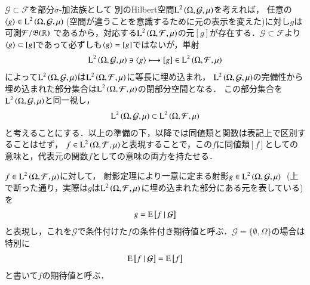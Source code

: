 	$\mathcal{G} \subset \mathcal{F}$を部分$\sigma$-加法族として
	別のHilbert空間$\operatorname{L}^{2} \left(\Omega, \mathcal{G},\mu\right)$を考えれば，
	任意の$\inprod<g> \in \Lp{2}{\Omega, \mathcal{G},\mu}\ $(空間が違うことを意識するために元の表示を変えた)に対し$g$は可測$\mathcal{F}/\mathfrak{B}(\mathbb{R})$
	であるから，対応する$\operatorname{L}^{2} \left(\Omega, \mathcal{F},\mu\right)$の元$[g]$が存在する．$\mathcal{G} \subset \mathcal{F}$より
	$\inprod<g> \subset [g]$であって必ずしも$\inprod<g> = [g]$ではないが，単射
	\begin{align}
		\Lp{2}{\Omega, \mathcal{G},\mu} \ni \inprod<g> \longmapsto [g] \in \Lp{2}{\Omega, \mathcal{F},\mu}
	\end{align}
	によって$\operatorname{L}^{2} \left(\Omega, \mathcal{G},\mu\right)$は$\operatorname{L}^{2} \left(\Omega, \mathcal{F},\mu\right)$に等長に埋め込まれ，
	$\operatorname{L}^{2} \left(\Omega, \mathcal{G},\mu\right)$の完備性から埋め込まれた部分集合は$\operatorname{L}^{2} \left(\Omega, \mathcal{F},\mu\right)$の閉部分空間となる．
	この部分集合を$\operatorname{L}^{2} \left(\Omega, \mathcal{G},\mu\right)$と同一視し，
	\begin{align}
		\operatorname{L}^{2} \left(\Omega, \mathcal{G},\mu\right) \subset \operatorname{L}^{2} \left(\Omega, \mathcal{F},\mu\right)
	\end{align}
	と考えることにする．以上の準備の下，以降では同値類と関数は表記上で区別することはせず，
	$f \in \operatorname{L}^{2} \left(\Omega, \mathcal{F},\mu\right)$と表現することで，この$f$に同値類$[f]$としての意味と，代表元の関数$f$としての意味の両方を持たせる．
	
	\begin{dfn}[条件付き期待値]
		$f \in \operatorname{L}^{2} \left(\Omega, \mathcal{F},\mu\right)$に対して，
		射影定理により一意に定まる射影$g \in \operatorname{L}^{2} \left(\Omega, \mathcal{G},\mu\right)\ $
		(上で断った通り，実際は$g$は$\operatorname{L}^{2} \left(\Omega, \mathcal{F},\mu\right)$に埋め込まれた部分にある元を表している)を
		\begin{align}
			g = \operatorname{E} \left[ f \ \middle|\ \mathcal{G} \right]
		\end{align}
		と表現し，これを$\mathcal{G}$で条件付けた$f$の条件付き期待値と呼ぶ．$\mathcal{G} = \{\emptyset, \Omega\}$の場合は特別に
		\begin{align}
			\operatorname{E} \left[ f \ \middle|\ \mathcal{G} \right] = \operatorname{E} \left[ f \right]
		\end{align}
		と書いて$f$の期待値と呼ぶ．
	\end{dfn}
	
